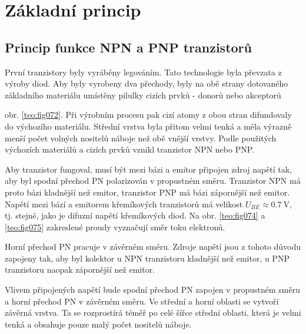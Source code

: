   \section{Základní princip}\label{es:IchapVsecII}
    \subsection{Princip funkce NPN a PNP tranzistorů}\label{es:IchapVsecIIssecI}
      První tranzistory byly vyráběny legováním. Tato technologie byla převzata z výroby diod. Aby
      byly vyrobeny dva přechody, byly na obě strany dotovaného základního materiálu umístěny
      pilulky cizích prvků - donorů nebo akceptorů {obr. \ref{teo:fig072}. Při výrobním procesu pak
      cizí atomy z obou stran difundovaly do výchozího materiálu. Střední vrstva byla přitom velmi
      tenká a měla výrazně menší počet volných nositelů náboje než obě vnější vrstvy. Podle
      použitých výchozích materiálů a cizích prvků vznikl tranzistor NPN nebo PNP.

      
      Aby tranzistor fungoval, musí být mezi bázi a emitor připojen zdroj napětí tak, aby byl spodní
      přechod PN polarizován v propustném směru. Tranzistor NPN má proto bázi kladnější než emitor,
      tranzistor PNP má bázi zápornější než emitor. Napětí mezi bází a emitorem křemíkových
      tranzistorů má velikost \(U_{BE} \approx \SI{0.7}{\V}\), tj. stejné, jako je difuzní napětí
      křemíkových diod. Na obr. \ref{teo:fig074} a \ref{teo:fig075} zakreslené proudy vyznačují směr
      toku elektronů.

      
      Horní přechod PN pracuje v závěrném směru. Zdroje napětí jsou z tohoto důvodu zapojeny tak,
      aby byl kolektor u NPN tranzistoru kladnější než emitor, u PNP tranzistoru naopak zápornější
      než emitor.

      Vlivem připojených napětí bude spodní přechod PN zapojen v propustném směru a horní přechod PN
      v závěrném směru. Ve střední a horní oblasti se vytvoří závěrná vrstva. Ta se rozprostírá
      téměř po celé šířce střední oblasti, která je velmi tenká a obsahuje pouze malý počet nositelů
      náboje.        

}

